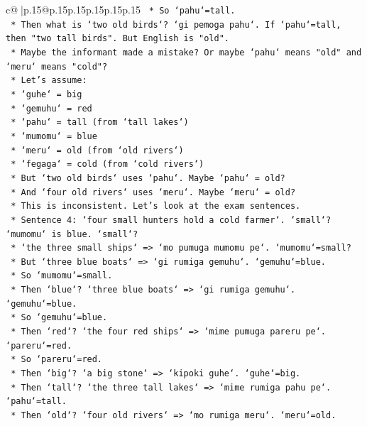 \documentclass{article}
\begin{document}
{\begin{supertabular}{c@{$\;$}|p{.15\linewidth}@{}p{.15\linewidth}p{.15\linewidth}p{.15\linewidth}p{.15\linewidth}p{.15\linewidth}}
{{{\texttt{    *   So `pahu`=tall.} \\
\texttt{    *   Then what is `two old birds`? `gi pemoga pahu`. If `pahu`=tall, then "two tall birds". But English is "old".} \\
\texttt{    *   Maybe the informant made a mistake? Or maybe `pahu` means "old" and `meru` means "cold"?} \\
\texttt{    *   Let's assume:} \\
\texttt{        *   `guhe` = big} \\
\texttt{        *   `gemuhu` = red} \\
\texttt{        *   `pahu` = tall (from `tall lakes`)} \\
\texttt{        *   `mumomu` = blue} \\
\texttt{        *   `meru` = old (from `old rivers`)} \\
\texttt{        *   `fegaga` = cold (from `cold rivers`)} \\
\texttt{    *   But `two old birds` uses `pahu`. Maybe `pahu` = old?} \\
\texttt{    *   And `four old rivers` uses `meru`. Maybe `meru` = old?} \\
\texttt{    *   This is inconsistent. Let's look at the exam sentences.} \\
\texttt{    *   Sentence 4: `four small hunters hold a cold farmer`. `small`? `mumomu` is blue. `small`?} \\
\texttt{    *   `the three small ships` => `mo pumuga mumomu pe`. `mumomu`=small?} \\
\texttt{    *   But `three blue boats` => `gi rumiga gemuhu`. `gemuhu`=blue.} \\
\texttt{    *   So `mumomu`=small.} \\
\texttt{    *   Then `blue`? `three blue boats` => `gi rumiga gemuhu`. `gemuhu`=blue.} \\
\texttt{    *   So `gemuhu`=blue.} \\
\texttt{    *   Then `red`? `the four red ships` => `mime pumuga pareru pe`. `pareru`=red.} \\
\texttt{    *   So `pareru`=red.} \\
\texttt{    *   Then `big`? `a big stone` => `kipoki guhe`. `guhe`=big.} \\
\texttt{    *   Then `tall`? `the three tall lakes` => `mime rumiga pahu pe`. `pahu`=tall.} \\
\texttt{    *   Then `old`? `four old rivers` => `mo rumiga meru`. `meru`=old.} \\
}}}
\end{supertabular}}
\end{document}
